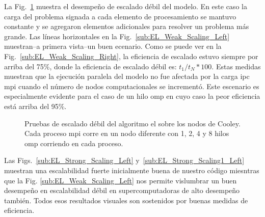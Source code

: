 {La Fig.~\ref{fig:EL_Weak_Scaling} muestra el desempeño de escalado débil del modelo.
En este caso la carga del problema signada a cada elemento de procesamiento se mantuvo constante  y se agregaron elementos adicionales para resolver un problema más grande.
Las líneas horizontales en la Fig.~\ref{sub:EL_Weak_Scaling_Left} muestran--a primera vista--un buen ecenario.
Como se puede ver en la Fig.~\ref{sub:EL_Weak_Scaling_Right}, la eficiencia de escalado estuvo siempre por arriba del 75\%, donde la eficiencia de escalado débil es: $t_1 / t_N * 100$.
Estas medidas muestran que la ejecución paralela del modelo no fue afectada por la carga \gls{ipc} \gls{mpi} cuando el número de nodos computacionales se incrementó.
Este escenario es especialmente evidente para el caso de un hilo \gls{omp} en cuyo caso la peor eficiencia está arriba del 95\%.

\begin{figure}[tb] 
    \centering
    \hfill

	\caption{Pruebas de escalado débil del algoritmo \gls{el} sobre los nodos de Cooley. Cada proceso \gls{mpi} corre en un nodo diferente con 1, 2, 4 y 8 hilos \gls{omp} corriendo en cada proceso.}
  \label{fig:EL_Weak_Scaling} 
\end{figure}

Las Figs.~\ref{sub:EL_Strong_Scaling_Left} y~\ref{sub:EL_Strong_Scaling1_Left} muestran una escalabilidad fuerte inicialmente buena de nuestro código miesntras que la Fig. \ref{sub:EL_Weak_Scaling_Left} nos permite vislumbrar un buen desempeño en escalabilidad débil en supercomputadoras de alto desempeño también.
Todos esos resultados visuales son sostenidos por buenas medidas de eficiencia.
}{
}
